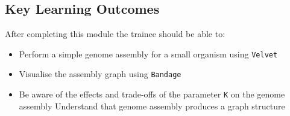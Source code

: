 
\chapter{\moduleTitle}
\newpage


% 
\section{Key Learning Outcomes}

After completing this module the trainee should be able to:
\begin{itemize}
  \item Perform a simple genome assembly for a small organism using \texttt{Velvet}
  \item Visualise the assembly graph using \texttt{Bandage}
  \item Be aware of the effects and trade-offs of the parameter \texttt{K} on the genome assembly
  \teim Understand that genome assembly produces a graph structure
\end{itemize}

